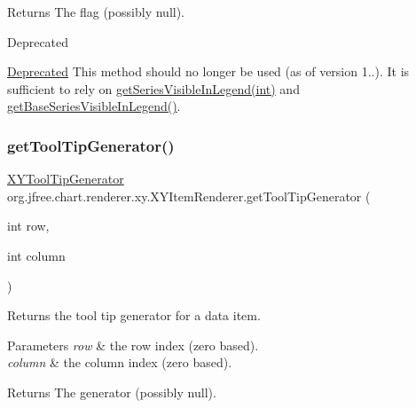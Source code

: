 \begin{DoxyReturn}{Returns}
The flag (possibly {\ttfamily null}).
\end{DoxyReturn}
\begin{DoxyRefDesc}{Deprecated}
\item[\mbox{\hyperlink{deprecated__deprecated000216}{Deprecated}}]This method should no longer be used (as of version 1..). It is sufficient to rely on \mbox{\hyperlink{interfaceorg_1_1jfree_1_1chart_1_1renderer_1_1xy_1_1_x_y_item_renderer_a97403e6361d393a47b63139499d71b06}{get\+Series\+Visible\+In\+Legend(int)}} and \mbox{\hyperlink{interfaceorg_1_1jfree_1_1chart_1_1renderer_1_1xy_1_1_x_y_item_renderer_ac39942d497bba9355b4b1e597028ce1a}{get\+Base\+Series\+Visible\+In\+Legend()}}. \end{DoxyRefDesc}
\mbox{\label{interfaceorg_1_1jfree_1_1chart_1_1renderer_1_1xy_1_1_x_y_item_renderer_a90ed45f2e76d920007c655208d980dc0}} 
\subsubsection{\texorpdfstring{get\+Tool\+Tip\+Generator()}{getToolTipGenerator()}}
{\footnotesize\ttfamily \mbox{\hyperlink{interfaceorg_1_1jfree_1_1chart_1_1labels_1_1_x_y_tool_tip_generator}{X\+Y\+Tool\+Tip\+Generator}} org.\+jfree.\+chart.\+renderer.\+xy.\+X\+Y\+Item\+Renderer.\+get\+Tool\+Tip\+Generator (\begin{DoxyParamCaption}\item[{int}]{row,  }\item[{int}]{column }\end{DoxyParamCaption})}

Returns the tool tip generator for a data item.


\begin{DoxyParams}{Parameters}
{\em row} & the row index (zero based). \\
\hline
{\em column} & the column index (zero based).\\
\hline
\end{DoxyParams}
\begin{DoxyReturn}{Returns}
The generator (possibly {\ttfamily null}). 
\end{DoxyReturn}


